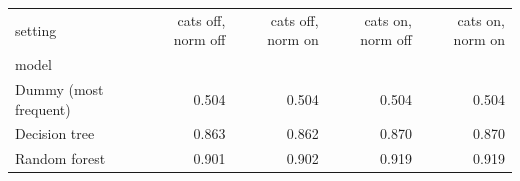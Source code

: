 \begin{tabular}{lrrrr}
\toprule
setting & cats off, norm off & cats off, norm on & cats on, norm off & cats on, norm on \\
model &  &  &  &  \\
\midrule
Dummy (most frequent) & 0.504 & 0.504 & 0.504 & 0.504 \\
Decision tree & 0.863 & 0.862 & 0.870 & 0.870 \\
Random forest & 0.901 & 0.902 & 0.919 & 0.919 \\
\bottomrule
\end{tabular}
